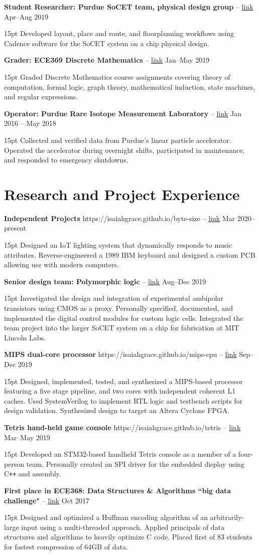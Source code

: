 \documentclass[10pt,letterpaper]{article}
\newcommand{\resumeItem}[4]{
	\begingroup
	\def\link{#2}
	\textbf{#1}
	\ifx\link\empty \else 
		-- \href{#2}{link}
	\fi
	\hfill #3\\
	\begin{adjustwidth}{15pt}{}
	#4
	\end{adjustwidth}
	\endgroup
}
\begin{document}
\resumeItem
{Student Researcher: Purdue SoCET team, physical design group}
{}
{Apr--Aug 2019}
{Developed layout, place and route, and floorplanning workflows using Cadence software for the SoCET system on a chip physical design.}

\resumeItem
{Grader: ECE369 Discrete Mathematics}
{}
{Jan--May 2019}
{Graded Discrete Mathematics course assignments covering theory of computation, formal logic, graph theory, mathematical induction, state machines, and regular expressions.}

\resumeItem
{Operator: Purdue Rare Isotope Measurement Laboratory}
{}
{Jan 2016 -- May 2018}
{Collected and verified data from Purdue's linear particle accelerator. Operated the accelerator during overnight shifts, participated in maintenance, and responded to emergency shutdowns.}

\section*{Research and Project Experience}
\resumeItem
{Independent Projects}
{https://isaiahgrace.github.io/byte-size}
{Mar 2020--present}
{Designed an IoT lighting system that dynamically responds to music attributes. Reverse-engineered a 1989 IBM keyboard and designed a custom PCB allowing use with modern computers.}

\resumeItem
{Senior design team: Polymorphic logic}
{}
{Aug--Dec 2019}
{Investigated the design and integration of experimental ambipolar transistors using CMOS as a proxy. Personally specified, documented, and implemented the digital control modules for custom logic cells. Integrated the team project into the larger SoCET system on a chip for fabrication at MIT Lincoln Labs.}

\resumeItem
{MIPS dual-core processor}
{https://isaiahgrace.github.io/mips-cpu}
{Sep--Dec 2019}
{Designed, implemented, tested, and synthesized a MIPS-based processor featuring a five stage pipeline, and two cores with independent coherent L1 caches. Used SystemVerilog to implement RTL logic and testbench scripts for design validation. Synthesized design to target an Altera Cyclone FPGA.}

\resumeItem
{Tetris hand-held game console}
{https://isaiahgrace.github.io/tetris}
{Mar--May 2019}
{Developed an STM32-based handheld Tetris console as a member of a four-person team. Personally created an SPI driver for the embedded display using C\texttt{++} and assembly.}

\resumeItem
{First place in ECE368: Data Structures \& Algorithms ``big data challenge"}
{}
{Oct 2017}
{Designed and optimized a Huffman encoding algorithm of an arbitrarily-large input using a multi-threaded approach. Applied principals of data structures and algorithms to heavily optimize C code. Placed first of 83 students for fastest compression of 64GB of data.}
\end{document}

